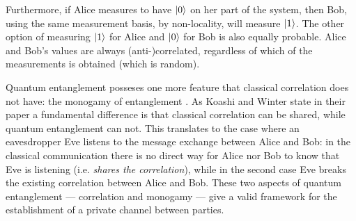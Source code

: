 	Furthermore, if Alice measures to have $|0 \rangle$ on her part of the system, then Bob, using the same measurement basis, by non-locality, will measure $|1 \rangle$.
	The other option of measuring $|1 \rangle$ for Alice and $|0 \rangle$ for Bob is also equally probable.
	Alice and Bob's values are always (anti-)correlated, regardless of which of the measurements is obtained (which is random).

	
	Quantum entanglement posseses one more feature that classical correlation does not have: the monogamy of entanglement \cite{KW04}. 
	As Koashi and Winter state in their paper a fundamental difference is that classical correlation can be shared, while quantum entanglement can not. 
	This translates to the case where an eavesdropper Eve listens to the message exchange between Alice and Bob: in the classical communication there is no direct way for Alice nor Bob to know that Eve is listening (i.e. \textit{shares the correlation}), while in the second case Eve breaks the existing correlation between Alice and Bob.
These two aspects of quantum entanglement --- correlation and monogamy --- give a valid framework for the establishment of a private channel between parties.
	
	
%			
		

